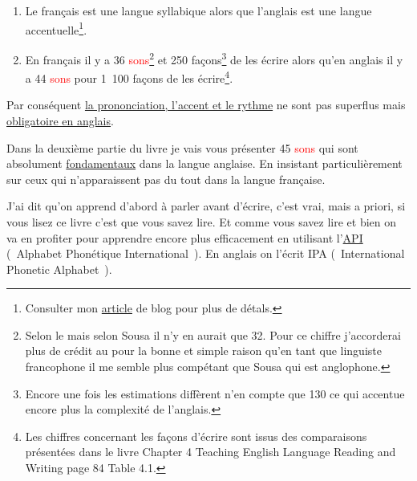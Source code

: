 \begin{enumerate}
\item Le français est une langue syllabique alors que l'anglais est
  une langue accentuelle\footnote{Consulter mon \href{http://doyouspeakenglish.fr/laccent-tonique-en-anglais/}{article} de
    blog pour plus de détals.}.
\item En français il y a 36 \textcolor{red}{sons}\footnote{Selon le  mais selon Sousa il
    n'y en aurait que 32. Pour ce chiffre j'accorderai plus de crédit
    au \GE pour la bonne et simple raison qu'en tant que linguiste
    francophone il me semble plus compétant que Sousa qui est
    anglophone.} et 250 façons\footnote{Encore une fois les
    estimations diffèrent \GE n'en compte que 130 ce qui accentue
    encore plus la complexité de l'anglais.} de les écrire alors qu'en
  anglais il y a 44 \textcolor{red}{sons} pour 1~100 façons de les écrire\footnote{Les
    chiffres concernant les façons d'écrire sont issus des
    comparaisons présentées dans le livre \HTEBL Chapter 4 Teaching
    English Language Reading and Writing page 84 Table 4.1.}.
\end{enumerate}

Par conséquent \underline{la prononciation, l'accent et le rythme} ne sont pas
superflus mais \underline{obligatoire en anglais}.\par

Dans la deuxième partie du livre je vais vous présenter 45
\textcolor{red}{sons} qui sont absolument \underline{fondamentaux}
dans la langue anglaise. En insistant particulièrement sur ceux qui
n'apparaissent pas du tout dans la langue française. %

J'ai dit qu'on apprend d'abord à parler avant d'écrire, c'est vrai,
mais a priori, si vous lisez ce livre c'est que vous savez lire. Et
comme vous savez lire et bien on va en profiter pour apprendre encore
plus efficacement en utilisant
l'\href{https://fr.wikipedia.org/wiki/Alphabet\_phon\%25C3\%25A9tique\_international}{API}
(~Alphabet Phonétique International~). En anglais on l'écrit
IPA
(~International Phonetic Alphabet~).\par

